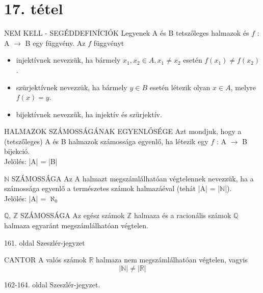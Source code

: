 \section{17. tétel}

\begin{definicio}{NEM KELL - SEGÉDDEFINÍCIÓK}
Legyenek A és B tetszőleges halmazok és $f$ : A $\to$ B egy függvény. Az $f$ függvényt
\begin{itemize}
\item injektívnek nevezzük, ha bármely $x_1, x_2 \in A, x_1 \neq x_2$ esetén $f(x_1) \neq f(x_2)$.
\item szürjektívnek nevezzük, ha bármely $y \in B$ esetén létezik olyan $x \in A$, melyre $f(x) = y$.
\item bijektívnek nevezzük, ha injektív és szürjektív.
\end{itemize}
\end{definicio}

\begin{definicio}{HALMAZOK SZÁMOSSÁGÁNAK EGYENLŐSÉGE}
Azt mondjuk, hogy a (tetszőleges) A és B halmazok számossága egyenlő, ha létezik egy $f$ : A $\to$ B bijekció.\\
Jelölés: |A| = |B|
\end{definicio}

\begin{definicio}{$\mathbb{N}$ SZÁMOSSÁGA}
Az A halmazt megszámlálhatóan végtelennek nevezzük, ha a számossága egyenlő a természetes számok halmazáéval (tehát |A| = |$\mathbb{N}$|).\\
Jelölés: |A| = $\aleph_0$
\end{definicio}

\begin{tetel}{$\mathbb{Q}$, $\mathbb{Z}$ SZÁMOSSÁGA}
Az egész számok $\mathbb{Z}$ halmaza és a racionális számok $\mathbb{Q}$ halmaza egyaránt megszámlálhatóan végtelen.
\end{tetel}

\begin{bizonyitas}{}
161. oldal Szeszlér-jegyzet
\end{bizonyitas}

\begin{tetel}{CANTOR}
A valós számok $\mathbb{R}$ halmaza nem megszámlálhatóan végtelen, vagyis $$|\mathbb{N}| \neq |\mathbb{R}|$$
\end{tetel}

\begin{bizonyitas}{}
162-164. oldal Szeszlér-jegyzet.
\end{bizonyitas}

